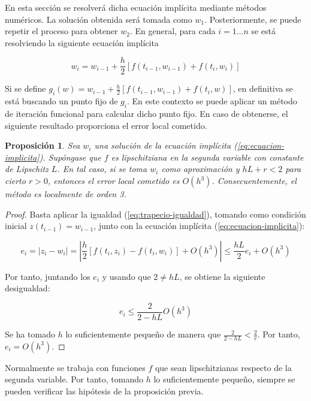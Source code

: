 \documentclass{article}
\theoremstyle{theorem-style}  %
\newtheorem{proposition}[theorem]{Proposición}
\theoremstyle{definition-style}
\theoremstyle{example-style}
\begin{document}
	En esta sección se resolverá dicha ecuación implícita mediante métodos numéricos. La solución obtenida será tomada como $w_1$. Posteriormente, se puede repetir el proceso para obtener $w_2$. En general, para cada $i = 1 \ldots n$ se está resolviendo la siguiente ecuación implícita

	\begin{equation} \label{eq:ecuacion-implicita}
		w_i = w_{i-1} + \frac{h}{2} \left[f(t_{i-1},w_{i-1}) + f(t_i, w_i)\right]
	\end{equation}

	Si se define $g_i(w) = w_{i-1} + \frac{h}{2} \left[f(t_{i-1},w_{i-1}) + f(t_i, w)\right]$, en definitiva se está buscando un punto fijo de $g_i$. En este contexto se puede aplicar un método de iteración funcional para calcular dicho punto fijo. En caso de obtenerse, el siguiente resultado proporciona el error local cometido.

	\begin{proposition} \label{prop:implicito:error}
		Sea $w_i$ una solución de la ecuación implícita (\ref{eq:ecuacion-implicita}). Supóngase que $f$ es lipschitziana en la segunda variable con constante de Lipschitz $L$. En tal caso, si se toma $w_i$ como aproximación y $hL+r < 2$ para cierto $r >0$, entonces el error local cometido es $O(h^3)$. Consecuentemente, el método es localmente de orden 3.
	\end{proposition}

	\begin{proof}
		Basta aplicar la igualdad (\ref{eq:trapecio-igualdad}), tomando como condición inicial $z(t_{i-1}) = w_{i-1}$, junto con la ecuación implícita (\ref{eq:ecuacion-implicita}):
		
		\begin{equation*}
			e_i = \left|z_i - w_i \right| = \left|\frac{h}{2} \left[ f(t_i, z_i) - f(t_i, w_i) \right] + O(h^3) \right| \le \frac{hL}{2} e_i + O(h^3)
		\end{equation*}

		Por tanto, juntando los $e_i$ y usando que $2 \ne hL$, se obtiene la siguiente desigualdad:

		$$ e_i \le \frac{2}{2-hL} O(h^3) $$

		Se ha tomado $h$ lo suficientemente pequeño de manera que $\frac{2}{2-hL} < \frac{2}{r}$. Por tanto, $e_i = O(h^3)$.
	\end{proof}

	Normalmente se trabaja con funciones $f$ que sean lipschitzianas respecto de la segunda variable. Por tanto, tomando $h$ lo suficientemente pequeño, siempre se pueden verificar las hipótesis de la proposición previa.
\end{document}
